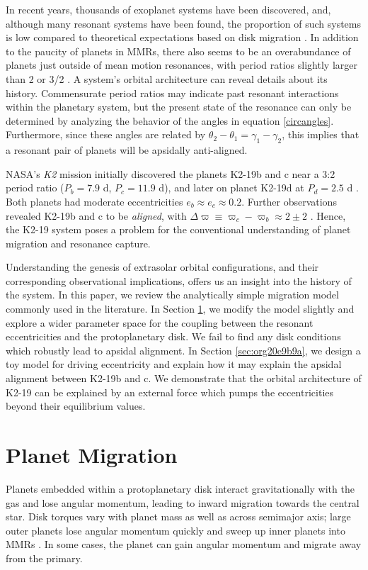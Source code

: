 \documentclass{mnras}
\begin{document}
In recent years, thousands of exoplanet systems have been discovered,
and, although many resonant systems have been found, the proportion of
such systems is low compared to theoretical expectations based on disk
migration \cite{fabrycky_architecture_2014}.  In addition to the paucity
of planets in MMRs, there also seems to be an overabundance of planets
just outside of mean motion resonances, with period ratios slightly
larger than 2 or 3/2
\cite{fabrycky_architecture_2014,choksi_sub-neptune_2020}.
A system's orbital architecture can reveal details about its history.
Commensurate period ratios may indicate past resonant interactions
within the planetary system, but the present state of the resonance
can only be determined by analyzing the behavior of the angles in
equation \eqref{circangles}.  Furthermore, since these angles are
related by \(\theta_2-\theta_1=\gamma_1-\gamma_2\), this implies that a
resonant pair of planets will be apsidally anti-aligned.

NASA's \emph{K2} mission initially discovered the planets K2-19b and c
near a 3:2 period ratio (\(P_b=7.9\) d, \(P_c=11.9\) d), and later on
planet K2-19d at \(P_d=2.5\) d
\cite{howell14_k2_mission,armstrong15_one_closes_exopl_pairs_to,sinukoff16_eleven_multip_system_fromk_masses}.
Both planets had moderate eccentricities \(e_b\approx e_c\approx 0.2\).
Further observations revealed K2-19b and c to be \emph{aligned}, with
\(\Delta\varpi\equiv \varpi_c-\varpi_b \approx 2\pm 2\)
\cite{petigura_k2-19b_2020}.  Hence, the K2-19 system poses a problem
for the conventional understanding of planet migration and resonance
capture.

Understanding the genesis of extrasolar orbital configurations, and
their corresponding observational implications, offers us an insight
into the history of the system.  In this paper, we review the
analytically simple migration model commonly used in the literature.
In Section \ref{sec:org0976d26}, we modify the model slightly and explore
a wider parameter space for the coupling between the resonant
eccentricities and the protoplanetary disk. We fail to find any disk
conditions which robustly lead to apsidal alignment.  In Section
\ref{sec:org20e9b9a}, we design a toy model for driving eccentricity and
explain how it may explain the apsidal alignment between K2-19b and
c. We demonstrate that the orbital architecture of K2-19 can be
explained by an external force which pumps the eccentricities beyond
their equilibrium values.

\section{Planet Migration}
\label{sec:org0976d26}
Planets embedded within a protoplanetary disk interact gravitationally
with the gas and lose angular momentum, leading to inward migration
towards the central star.  Disk torques vary with planet mass as well
as across semimajor axis; large outer planets lose angular momentum
quickly and sweep up inner planets into MMRs
\cite{tanaka_three-dimensional_2004,xu_migration_2018}.  In some
cases, the planet can gain angular momentum and migrate away from the
primary.
\end{document}

